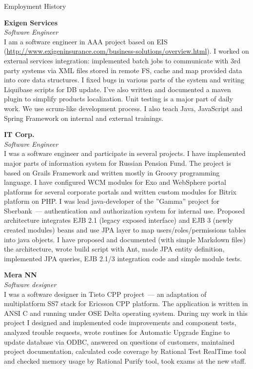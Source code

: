 \begin{rubric}{Employment History}

  \parbox{\EmpHistoryBlock}{
  \textbf{Exigen Services}\\
  \textit{Software Engineer}\\
  I am a software engineer in AAA project based on EIS
  (\url{http://www.exigeninsurance.com/business-solutions/overview.html}).
  I worked on external services integration: implemented batch jobs to
  communicate with 3rd party systems via XML files stored in remote FS,
  cache and map provided data into core data structures. I fixed
  bugs in various parts of the system and writing Liquibase scripts for DB
  update.
  I've also written and documented a maven plugin to simplify products
  localization.
  Unit testing is a major part of daily work.
  We use scrum-like development process.
  I also teach Java, JavaScript and Spring Framework on internal and
  external trainings.
  }

  \parbox{\EmpHistoryBlock}{
  \textbf{IT Corp.}\\
  \textit{Software Engineer}\\
  I was a software engineer and participate in several projects.  I
  have implemented major parts of information system for Russian
  Pension Fund.  The project is based on Grails Framework and written
  mostly in Groovy programming language.
  I have configured WCM modules for Exo and WebSphere portal
  platforms for several corporate portals and written custom modules for
  Bitrix platform on PHP.
  I was lead java-developer of the ''Gamma'' project for Sberbank~--- 
  authentication and authorization system for internal use. Proposed
  architecture integrates EJB 2.1 (legacy exposed interface) and EJB 3
  (newly created modules) beans and use JPA layer to map
  users/roles/permissions tables into java objects. I have proposed and
  documented (with simple Markdown files) the architecture, wrote
  build script with Ant, made JPA entity definition, implemented JPA
  queries, EJB 2.1/3 integration code and simple module tests.
  }

  \parbox{\EmpHistoryBlock}{
  \textbf{Mera NN}\\
  \textit{Software designer}\\
  I was a software designer in Tieto CPP project~--- an adaptation of
  multiplatform SS7 stack for Ericsson CPP platform. The application
  is written in ANSI C and running under OSE Delta operating
  system. During my work in this project I designed and implemented
  code improvements and component tests, analyzed trouble requests,
  wrote routines for Automatic Upgrade Engine to update database via
  ODBC, answered on questions of customers, maintained project
  documentation, calculated code coverage by Rational Test RealTime
  tool and checked memory usage by Rational Purify tool, took exams
  at the new staff.
  }


\end{rubric}
